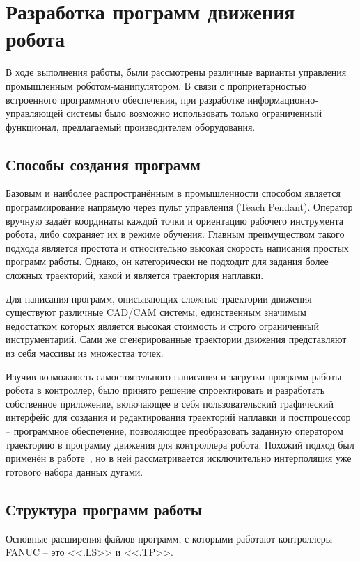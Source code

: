\section{Разработка программ движения робота}
В ходе выполнения работы, были рассмотрены различные варианты управления промышленным роботом-манипулятором.
В связи с проприетарностью встроенного программного обеспечения, при разработке информационно-управляющей системы было возможно использовать только ограниченный функционал, предлагаемый производителем оборудования.

\subsection{Способы создания программ}
Базовым и наиболее распространённым в промышленности способом является программирование напрямую через пульт управления (Teach Pendant).
Оператор вручную задаёт координаты каждой точки и ориентацию рабочего инструмента робота, либо сохраняет их в режиме обучения.
Главным преимуществом такого подхода является простота и относительно высокая скорость написания простых программ работы.
Однако, он категорически не подходит для задания более сложных траекторий, какой и является траектория наплавки.

Для написания программ, описывающих сложные траектории движения существуют различные CAD/CAM системы, единственным значимым недостатком которых является высокая стоимость и строго ограниченный инструментарий.
Сами же сгенерированные траектории движения представляют из себя массивы из множества точек.

Изучив возможность самостоятельного написания и загрузки программ работы робота в контроллер, было принято решение спроектировать и разработать собственное приложение, включающее в себя пользовательский графический интерфейс для создания и редактирования траекторий наплавки и постпроцессор -- программное обеспечение, позволяющее преобразовать заданную оператором траекторию в программу движения для контроллера робота.
Похожий подход был применён в работе~\cite{Nagata_2017}, но в ней рассматривается исключительно интерполяция уже готового набора данных дугами.

\subsection{Структура программ работы} \label{subsec:ProgramStructure}
Основные расширения файлов программ, с которыми работают контроллеры FANUC -- это <<.LS>> и <<.TP>>.

